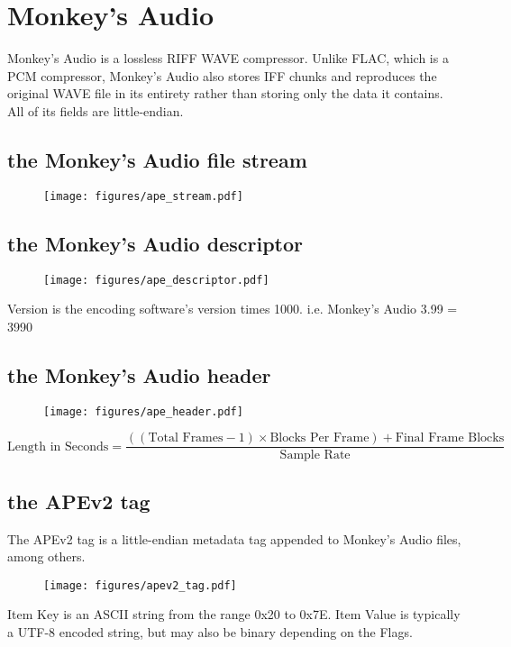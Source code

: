 
\chapter{Monkey's Audio}
Monkey's Audio is a lossless RIFF WAVE compressor.
Unlike FLAC, which is a PCM compressor, Monkey's Audio also stores
IFF chunks and reproduces the original WAVE file in its entirety rather
than storing only the data it contains.
All of its fields are little-endian.

\section{the Monkey's Audio file stream}
\begin{figure}[h]
\texttt{[image: figures/ape\_stream.pdf]}
\end{figure}

\section{the Monkey's Audio descriptor}
\begin{figure}[h]
\texttt{[image: figures/ape\_descriptor.pdf]}
\end{figure}
\par
\noindent
Version is the encoding software's version times 1000.
i.e. Monkey's Audio 3.99 = 3990

\section{the Monkey's Audio header}
\begin{figure}[h]
\texttt{[image: figures/ape\_header.pdf]}
\end{figure}
{
\begin{equation}
\text{Length in Seconds} = \frac{((\text{Total Frames} - 1) \times \text{Blocks Per Frame}) + \text{Final Frame Blocks}}{\text{Sample Rate}}
\end{equation}
}
\section{the APEv2 tag}
\label{apev2}
The APEv2 tag is a little-endian metadata tag appended to
Monkey's Audio files, among others.
\begin{figure}[h]
\texttt{[image: figures/apev2\_tag.pdf]}
\end{figure}
\par
\noindent
Item Key is an ASCII string from the range 0x20 to 0x7E.
Item Value is typically a UTF-8 encoded string, but may
also be binary depending on the Flags.

